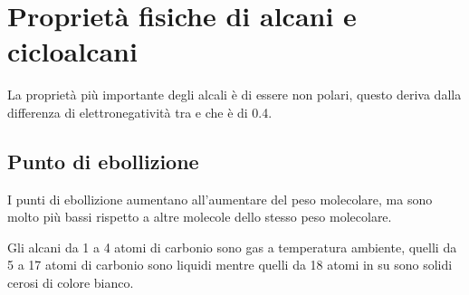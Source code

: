 \section{Proprietà fisiche di alcani e cicloalcani}
La proprietà più importante degli alcali è di essere non polari, questo deriva dalla differenza di elettronegatività tra  e  che è di 0.4.

\subsection{Punto di ebollizione}
I punti di ebollizione aumentano all'aumentare del peso molecolare, ma sono molto più bassi rispetto a altre molecole dello stesso peso molecolare.

Gli alcani da 1 a 4 atomi di carbonio sono gas a temperatura ambiente, quelli da 5 a 17 atomi di carbonio sono liquidi mentre quelli da 18 atomi in su sono solidi cerosi di colore bianco.

